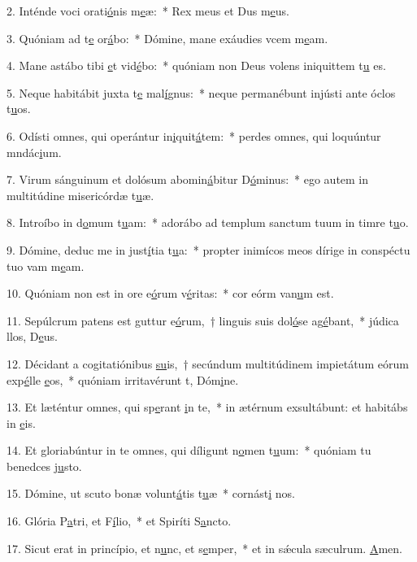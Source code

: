 2. Inténde voci orati\uline{ó}nis m\uline{e}æ:~* Rex meus et Dus m\uline{e}us.\par 
3. Quóniam ad t\uline{e} or\uline{á}bo:~* Dómine, mane exáudies vcem m\uline{e}am.\par 
4. Mane astábo tibi \uline{e}t vid\uline{é}bo:~* quóniam non Deus volens iniquittem t\uline{u} es.\par 
5. Neque habitábit juxta t\uline{e} mal\uline{í}gnus:~* neque permanébunt injústi ante óclos t\uline{u}os.\par 
6. Odísti omnes, qui operántur in\uline{i}quit\uline{á}tem:~* perdes omnes, qui loquúntur mndác\uline{i}um.\par 
7. Virum sánguinum et dolósum abomin\uline{á}bitur D\uline{ó}minus:~* ego autem in multitúdine misericórdæ t\uline{u}æ.\par 
8. Introíbo in d\uline{o}mum t\uline{u}am:~* adorábo ad templum sanctum tuum in timre t\uline{u}o.\par 
9. Dómine, deduc me in just\uline{í}tia t\uline{u}a:~* propter inimícos meos dírige in conspéctu tuo vam m\uline{e}am.\par 
10. Quóniam non est in ore e\uline{ó}rum v\uline{é}ritas:~* cor eórm van\uline{u}m est.\par 
11. Sepúlcrum patens est guttur e\uline{ó}rum,~† linguis suis dol\uline{ó}se ag\uline{é}bant,~* júdica llos, D\uline{e}us.\par 
12. Décidant a cogitatiónibus \uline{su}is,~† secúndum multitúdinem impietátum eórum exp\uline{é}lle \uline{e}os,~* quóniam irritavérunt t, Dóm\uline{i}ne.\par 
13. Et læténtur omnes, qui sp\uline{e}rant \uline{i}n te,~* in ætérnum exsultábunt: et habitábs in \uline{e}is.\par 
14. Et gloriabúntur in te omnes, qui díligunt n\uline{o}men t\uline{u}um:~* quóniam tu benedces j\uline{u}sto.\par 
15. Dómine, ut scuto bonæ volunt\uline{á}tis t\uline{u}æ~* cornást\uline{i} nos.\par 
16. Glória P\uline{a}tri, et F\uline{í}lio,~* et Spiríti S\uline{a}ncto.\par 
17. Sicut erat in princípio, et n\uline{u}nc, et s\uline{e}mper,~* et in sǽcula sæculrum. \uline{A}men.\par 
